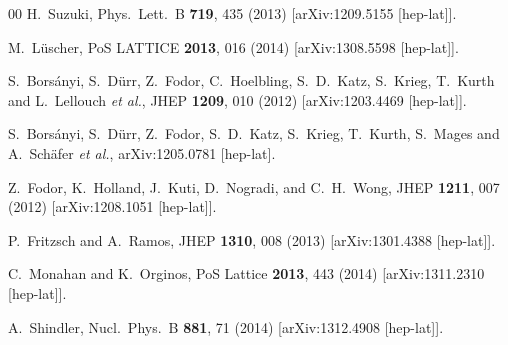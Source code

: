 \begin{thebibliography}{00}
  H.~Suzuki,
  Phys.\ Lett.\ B {\bf 719}, 435 (2013)
  [arXiv:1209.5155 [hep-lat]].

  M.~L\"uscher,
  PoS LATTICE {\bf 2013}, 016 (2014)
  [arXiv:1308.5598 [hep-lat]].

  S.~Bors\'anyi, S.~D\"urr, Z.~Fodor, C.~Hoelbling, S.~D.~Katz, S.~Krieg, T.~Kurth and L.~Lellouch {\it et al.},
  JHEP {\bf 1209}, 010 (2012)
  [arXiv:1203.4469 [hep-lat]].

  S.~Bors\'anyi, S.~D\"urr, Z.~Fodor, S.~D.~Katz, S.~Krieg, T.~Kurth, S.~Mages and A.~Sch\"afer {\it et al.},
  arXiv:1205.0781 [hep-lat].

  Z.~Fodor, K.~Holland, J.~Kuti, D.~Nogradi, and C.~H.~Wong,
  JHEP {\bf 1211}, 007 (2012)
  [arXiv:1208.1051 [hep-lat]].

  P.~Fritzsch and A.~Ramos,
  JHEP {\bf 1310}, 008 (2013)
  [arXiv:1301.4388 [hep-lat]].

  C.~Monahan and K.~Orginos,
  PoS Lattice {\bf 2013}, 443 (2014)
  [arXiv:1311.2310 [hep-lat]].

  A.~Shindler,
  Nucl.\ Phys.\ B {\bf 881}, 71 (2014)
  [arXiv:1312.4908 [hep-lat]].


\end{thebibliography}
